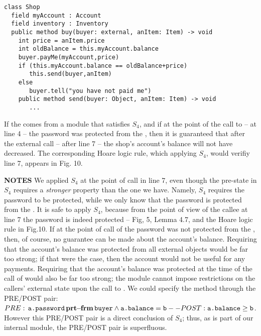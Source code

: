 \begin{lstlisting}
class Shop
  field myAccount : Account
  field inventory : Inventory    
  public method buy(buyer: external, anItem: Item) -> void
    int price = anItem.price
    int oldBalance = this.myAccount.balance
    buyer.payMe(myAccount,price)
    if (this.myAccount.balance == oldBalance+price)
       this.send(buyer,anItem)
    else
       buyer.tell("you have not paid me") 
    public method send(buyer: Object, anItem: Item) -> void  
       ...            
\end{lstlisting}
 
\noindent
 
If the  comes from a module that satisfies $S_4$, and if at the point of the call to  -- \ie at line 4 -- the password was protected from the , then it is guaranteed that after the external call -- \ie after line 7 --  the shop's account's balance will not have decreased.
{The corresponding Hoare logic rule, which applying  $S_4$, would verifiy line 7, appears in Fig. 10.}

 

\vspace{.1cm}

  \noindent
 \textbf{NOTES}
 \notesep We   applied $S_4$ at the point of call in line 7, even   though  
 the pre-state in $S_4$ requires %
 a \emph{stronger} property than the one we have.
 Namely,   $S_4$ requires   the password to be protected, while we only know 
  that the password is protected from the  .
It is safe to apply $S_4$,  because from the point of view of the callee at line 7 the password is indeed protected -- \cf Fig, 5,   Lemma 4.7, and the 
  Hoare logic rule in Fig.10.
  \notesep  If at the point of call of  the password was not protected from the , then, of course, no guarantee can be made about the account's balance.
 \notesep Requiring that the account's balance was protected from all external objects would be far too strong; if that were the case, then the account would not be useful for any payments.
 \notesep Requiring that the account's balance was protected at the time of the call of  would also be far too strong; the module cannot impose restrictions on the callers' external state  upon the call to .
 \notesep 
 We could specify the method  through the PRE/POST pair: $PRE: {\, {\texttt{a.password}}\, \mathbf{prt\!\!-\!\!frm}\, {\texttt{buyer}}} \wedge {{\texttt{a.balance}}}={\texttt{b}} -- POST: {\texttt{a.balance}}\geq {\texttt{b}}$. However this PRE/POST pair is a direct conclusion of $S_4$; thus, as  is part of our internal module, the PRE/POST pair is superfluous.
 
